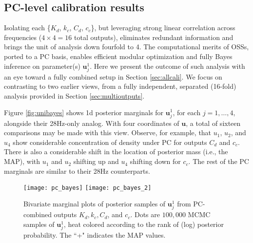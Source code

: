\documentclass[12pt]{article}
\begin{document}
\subsection{PC-level calibration results}
\label{sec:pcresult}

Isolating each \{$K_{d}$,  $k_{c}$,  $C_{d}$,  $c_{c}$\}, but leveraging
strong linear correlation across frequencies ($4 \times 4 = 16$ total
outputs), eliminates redundant information and brings the unit of analysis
down fourfold to 4.  The computational merits of OSSs, ported to a PC basis,
enables efficient modular optimization and fully Bayes inference on
parameter(s) $\mathbf{u}^1_j$. Here we present the outcome of such analysis
with an eye toward a fully combined setup in Section \ref{sec:allcali}.   We
focus on contrasting to two earlier views, from a fully independent,
separated (16-fold) analysis provided in Section \ref{sec:multioutputs}.

Figure \ref{fig:unibayes} shows 1d posterior marginals for $\mathbf{u}^1_j$,
for each $j=1,\dots,4$, alongside their 28Hz-only analog.  With four
coordinates of $\mathbf{u}$, a total of sixteen comparisons may be made with
this view.  Observe, for example, that $u_1$,  $u_2$, and $u_4$ show
considerable concentration of density under PC for outputs $C_d$ and $c_c$.
There is also a considerable shift in the location of posterior mass (i.e.,
the MAP), with $u_1$ and $u_2$ shifting up and $u_4$ shifting down for $c_c$.
The rest of the PC marginals are similar to their 28Hz counterparts.


\begin{figure}[ht!]
\centering
\texttt{[image: pc\_bayes]}
\texttt{[image: pc\_bayes\_2]}
\caption{Bivariate marginal plots of posterior samples of $\mathbf{u}^1_j$ 
from PC-combined outputs $K_d, k_c, C_d$, and $c_c$. Dots are
 $100{,}000$ MCMC samples of $\mathbf{u}^1_j$, heat colored according to the
 rank of (log) posterior probability. The ``+" indicates the MAP values. }
\label{fig:pcabayes_2}
\end{figure}
\end{document}

